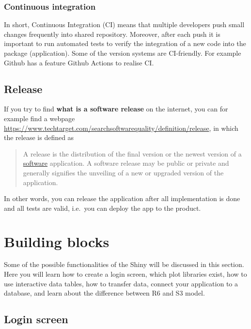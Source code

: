 \documentclass[
]{article}
\begin{document}
\hypertarget{continuous-integration}{%
\subsubsection{Continuous integration}\label{continuous-integration}}

In short, Continuous Integration (CI) means that multiple developers
push small changes frequently into shared repository. Moreover, after
each push it is important to run automated tests to verify the
integration of a new code into the package (application). Some of the
version systems are CI-friendly. For example Github has a feature Github
Actions to realise CI.

\hypertarget{release}{%
\subsection{Release}\label{release}}

If you try to find \textbf{what is a software release} on the internet,
you can for example find a webpage
\url{https://www.techtarget.com/searchsoftwarequality/definition/release},
in which the release is defined as

\begin{quote}
A release is the distribution of the final version or the newest version
of a
\href{https://www.techtarget.com/searchapparchitecture/definition/software}{software}
application. A software release may be public or private and generally
signifies the unveiling of a new or upgraded version of the application.
\end{quote}

In other words, you can release the application after all implementation
is done and all tests are valid, i.e.~you can deploy the app to the
product.

\hypertarget{building-blocks}{%
\section{Building blocks}\label{building-blocks}}

Some of the possible functionalities of the Shiny will be discussed in
this section. Here you will learn how to create a login screen, which
plot libraries exist, how to use interactive data tables, how to
transfer data, connect your application to a database, and learn about
the difference between R6 and S3 model.

\hypertarget{login-screen}{%
\subsection{Login screen}\label{login-screen}}
\end{document}
